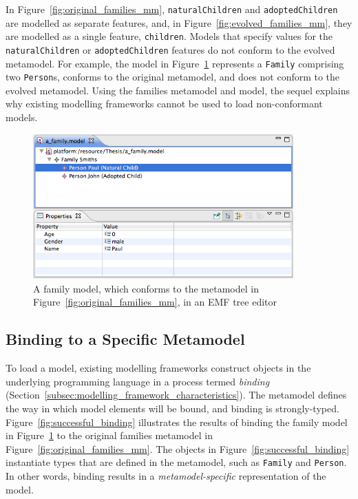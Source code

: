 In Figure~\ref{fig:original_families_mm}, \texttt{na\-tu\-r\-alCh\-il\-dr\-en} and \texttt{ad\-op\-t\-edCh\-il\-dr\-en} are modelled as separate features, and, in Figure~\ref{fig:evolved_families_mm}, they are modelled as a single feature, \texttt{ch\-il\-dr\-en}. Models that specify values for the \texttt{na\-tu\-r\-alCh\-il\-dr\-en} or \texttt{ad\-op\-t\-edCh\-il\-dr\-en} features do not conform to the evolved metamodel. For example, the model in Figure~\ref{fig:families_model} represents a \texttt{Fa\-mi\-ly} comprising two \texttt{Pe\-rs\-on}s, conforms to the original metamodel, and does not conform to the evolved metamodel. Using the families metamodel and model, the sequel explains why existing modelling frameworks cannot be used to load non-conformant models.

\begin{figure}[htbp]
  \begin{center}
    \leavevmode
    \includegraphics[width=10cm]{5.Implementation/images/family_model.png}
  \end{center}
  \caption[A family model]{A family model, which conforms to the metamodel in Figure~\ref{fig:original_families_mm}, in an EMF tree editor}
  \label{fig:families_model}
\end{figure}


\subsection{Binding to a Specific Metamodel}
\label{subsec:binding_specific}
To load a model, existing modelling frameworks construct objects in the underlying programming language in a process termed \emph{binding} (Section~\ref{subsec:modelling_framework_characteristics}). The metamodel defines the way in which model elements will be bound, and binding is strongly-typed. Figure~\ref{fig:successful_binding} illustrates the results of binding the family model in Figure~\ref{fig:families_model} to the original families metamodel in Figure~\ref{fig:original_families_mm}. The objects in Figure~\ref{fig:successful_binding} instantiate types that are defined in the metamodel, such as \texttt{Fa\-mi\-ly} and \texttt{Pe\-rs\-on}. In other words, binding results in a \emph{metamodel-specific} representation of the model.

